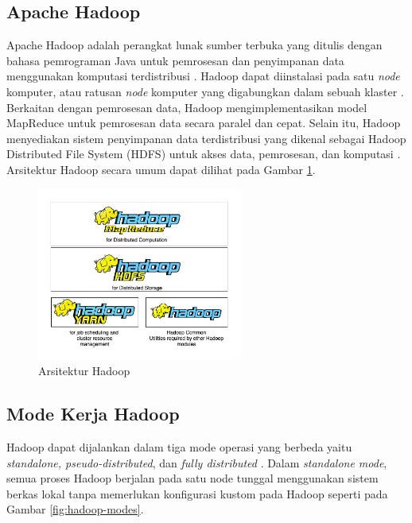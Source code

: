 \subsection{Apache Hadoop}
Apache Hadoop adalah perangkat lunak sumber terbuka yang ditulis dengan bahasa pemrograman Java untuk pemrosesan dan penyimpanan data menggunakan komputasi terdistribusi \cite{ApacheHadoop}. Hadoop dapat diinstalasi pada satu \textit{node} komputer, atau ratusan \textit{node} komputer yang digabungkan dalam sebuah klaster \cite{maneasEvolutionHadoopDistributed2018}. Berkaitan dengan pemrosesan data, Hadoop mengimplementasikan model MapReduce untuk pemrosesan data secara paralel dan cepat. Selain itu, Hadoop menyediakan sistem penyimpanan data terdistribusi yang dikenal sebagai Hadoop Distributed File System (HDFS) untuk akses data, pemrosesan, dan komputasi \cite{dabasAnalysisCommentsYoutube2019}. Arsitektur Hadoop secara umum dapat dilihat pada Gambar \ref{fig:hadoop-str}.

\begin{figure}[h!]
    \centering
    \includegraphics[width=0.6\textwidth]{figures/ch02/hadoop-str}
    \caption{Arsitektur Hadoop}
    \label{fig:hadoop-str}
\end{figure}

\subsection{Mode Kerja Hadoop}
Hadoop dapat dijalankan dalam tiga mode operasi yang berbeda yaitu \textit{standalone, pseudo-distributed}, dan \textit{fully distributed} \cite{johnDataLakeEnterprises2017}. Dalam \textit{standalone mode}, semua proses Hadoop berjalan pada satu node tunggal menggunakan sistem berkas lokal tanpa memerlukan konfigurasi kustom pada Hadoop seperti pada Gambar \ref{fig:hadoop-modes}. 

